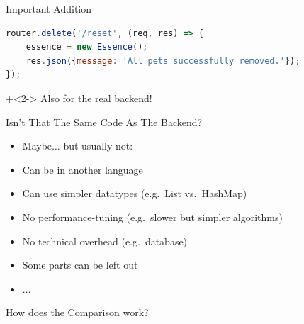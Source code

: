 \begin{frame}[fragile]{Important Addition}

\begin{lstlisting}[language=Javascript]
router.delete('/reset', (req, res) => {
    essence = new Essence();
    res.json({message: 'All pets successfully removed.'});
});
\end{lstlisting}

\onslide+<2->
Also for the real backend!

\end{frame}


\begin{frame}[fragile]{Isn't That The Same Code As The Backend?}

\begin{itemize}
\item Maybe$\ldots$ but usually not:
\item Can be in another language
\item Can use simpler datatypes (e.g.~List vs.~HashMap)
\item No performance-tuning (e.g.~slower but simpler algorithms)
\item No technical overhead (e.g.~database)
\item Some parts can be left out
\item $\ldots$
\end{itemize}

\end{frame}

\begin{frame}[fragile]{}

\begin{center}
{\Huge
How does the Comparison work?
}
\end{center}

\end{frame}

